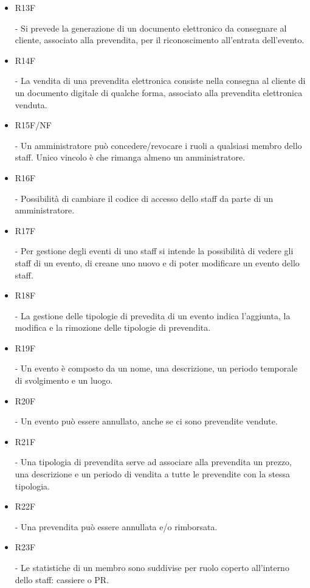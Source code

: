 \documentclass[a4paper]{article}
\begin{document}
\begin{itemize}
	\item \hypertarget{R13F}{R13F} - Si prevede la generazione di un documento elettronico da consegnare al cliente, associato alla prevendita, per il riconoscimento all'entrata dell'evento.
	
	\item \hypertarget{R14F}{R14F} - La vendita di una prevendita elettronica consiste nella consegna al cliente di un documento digitale di qualche forma, associato alla prevendita elettronica venduta.
	
	\item \hypertarget{R15F/NF}{R15F/NF} - Un amministratore può concedere/revocare i ruoli a qualsiasi membro dello staff. Unico vincolo è che rimanga almeno un amministratore.
	\item \hypertarget{R16F}{R16F} - Possibilità di cambiare il codice di accesso dello staff da parte di un amministratore.
	   
	\item \hypertarget{R17F}{R17F} - Per gestione degli eventi di uno staff si intende la possibilità di vedere gli staff di un evento, di creane uno nuovo e di poter modificare un evento dello staff.
		
	\item \hypertarget{R18F}{R18F} - La gestione delle tipologie di prevedita di un evento indica l'aggiunta, la modifica e la rimozione delle tipologie di prevendita.
	
	\item \hypertarget{R19F}{R19F} - Un evento è composto da un nome, una descrizione, un periodo temporale di svolgimento e un luogo. 
	\item \hypertarget{R20F}{R20F} - Un evento può essere annullato, anche se ci sono prevendite vendute.
	
	\item \hypertarget{R21F}{R21F} - Una tipologia di prevendita serve ad associare alla prevendita un prezzo, una descrizione e un periodo di vendita a tutte le prevendite con la stessa tipologia.

	\item \hypertarget{R22F}{R22F} - Una prevendita può essere annullata e/o rimborsata. 
	
	\item \hypertarget{R23F}{R23F} - Le statistiche di un membro sono suddivise per ruolo coperto all'interno dello staff: cassiere o PR.
	

\end{itemize}
\end{document}
